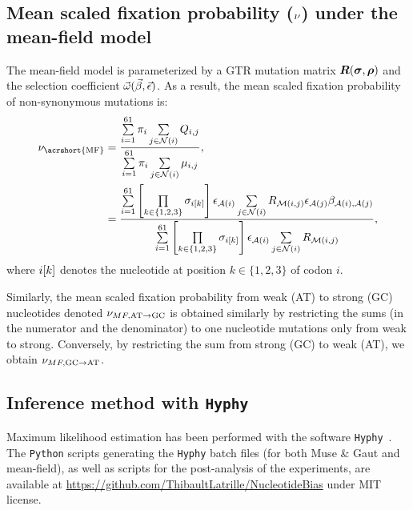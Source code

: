 \subsection{Mean scaled fixation probability (\texorpdfstring{$\nu$}{ν}) under the mean-field model}
\label{sec:mut-bias-mean-field-omega}
The mean-field model is parameterized by a \acrshort{GTR} mutation matrix $\bm{R}(\bm{\sigma}, \bm{\rho})$ and the selection coefficient $\vec{\omega}(\vec{\beta}, \vec{\epsilon})$.
As a result, the mean scaled fixation probability of \gls{non-synonymous} mutations is:
\begin{align}
    \avgpfix_{\text{\acrshort{MF}}} & = \dfrac{ \sum\limits\sumOverCodons \subequi_{\ci} \sum\limits_{\cj \in \setNonSynNeighbors} Q_{\itoj}}{ \sum\limits\sumOverCodons \subequi_{\ci} \sum\limits_{\cj \in \setNonSynNeighbors} \mu_{\itoj}}, \\
    & = \dfrac{ \sum\limits\sumOverCodons \left[\prod\limits_{k \in \{ 1, 2, 3 \}} \mutequi_{\ci[k]}\right] \AAequi_{\aai} \sum\limits_{\cj \in \setNonSynNeighbors} \mutmatrix_{\nucitoj} \AAequi_{\aaj} \AAexchan_{\aai, \aaj} }{\sum\limits\sumOverCodons \left[\prod\limits_{k \in \{ 1, 2, 3 \}} \mutequi_{\ci[k]}\right] \AAequi_{\aai} \sum\limits_{\cj \in \setNonSynNeighbors} \mutmatrix_{\nucitoj}},
\end{align}
where ${i}[k]$ denotes the nucleotide at position $k \in \{ 1, 2, 3 \}$ of \gls{codon} $i$.

Similarly, the mean scaled fixation probability from weak (AT) to strong (GC) nucleotides denoted $\nu_{MF, \text{AT} \rightarrow \text{GC}}$ is obtained similarly by restricting the sums (in the numerator and the denominator) to one nucleotide mutations only from weak to strong.
Conversely, by restricting the sum from strong (GC) to weak (AT), we obtain $\nu_{MF, \text{GC} \rightarrow \text{AT}}$.

\subsection{Inference method with \texttt{Hyphy}}
\label{subsec:inference-method-with-hyphy}

Maximum \gls{likelihood} estimation has been performed with the software \texttt{Hyphy}~\citep{Pond2005}.
The \texttt{Python} scripts generating the \texttt{Hyphy} batch files (for both Muse \& Gaut and mean-field), as well as scripts for the post-analysis of the experiments, are available at \url{https://github.com/ThibaultLatrille/NucleotideBias} under MIT license.
